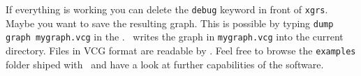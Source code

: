 If everything is working you can delete the \texttt{debug} keyword in front of \texttt{xgrs}.
Maybe you want to save the resulting graph.
This is possible by typing \texttt{dump graph mygraph.vcg} in the \GrShell.
\GrShell\ writes the graph in \texttt{mygraph.vcg} into the current directory.
Files in VCG format are readable by \yComp.
Feel free to browse the \texttt{examples} folder shiped with \GrG\ and have a look at further capabilities of the software.
